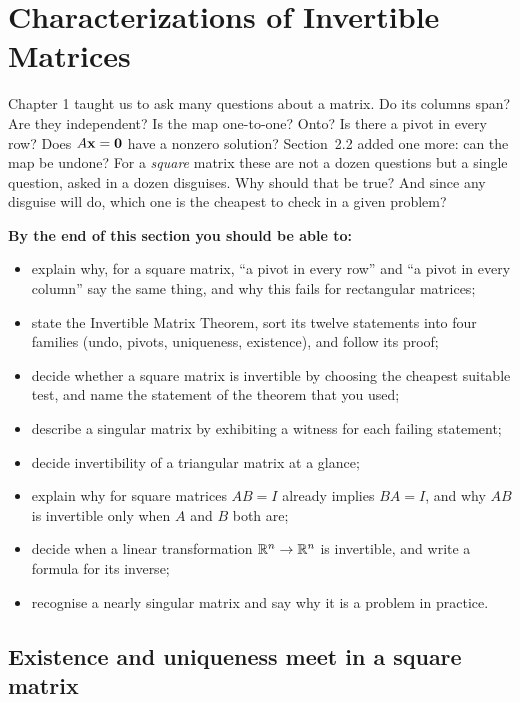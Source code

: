 \documentclass[11pt]{article}
\begin{document}
\section{Characterizations of Invertible Matrices}

\begin{guide}
Chapter 1 taught us to ask many questions about a matrix. Do its columns span? Are they independent? Is the map one-to-one? Onto? Is there a pivot in every row? Does $A\mathbf{x}=\mathbf{0}$ have a nonzero solution? Section~2.2 added one more: can the map be undone? For a \emph{square} matrix these are not a dozen questions but a single question, asked in a dozen disguises. Why should that be true? And since any disguise will do, which one is the cheapest to check in a given problem?
\end{guide}

\textbf{By the end of this section you should be able to:}
\begin{itemize}
  \item explain why, for a square matrix, ``a pivot in every row'' and ``a pivot in every column'' say the same thing, and why this fails for rectangular matrices;
  \item state the Invertible Matrix Theorem, sort its twelve statements into four families (undo, pivots, uniqueness, existence), and follow its proof;
  \item decide whether a square matrix is invertible by choosing the cheapest suitable test, and name the statement of the theorem that you used;
  \item describe a singular matrix by exhibiting a witness for each failing statement;
  \item decide invertibility of a triangular matrix at a glance;
  \item explain why for square matrices $AB=I$ already implies $BA=I$, and why $AB$ is invertible only when $A$ and $B$ both are;
  \item decide when a linear transformation $\mathbb{R}^n\to\mathbb{R}^n$ is invertible, and write a formula for its inverse;
  \item recognise a nearly singular matrix and say why it is a problem in practice.
\end{itemize}

\subsection*{Existence and uniqueness meet in a square matrix}
\end{document}
